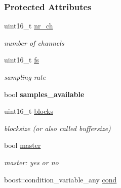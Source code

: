 \subsubsection*{Protected Attributes}
\begin{DoxyCompactItemize}
\item 
\hypertarget{class_h_w_thread_a316d76b7b23a93f25832b7a575cfb8db}{
uint16\_\-t \hyperlink{class_h_w_thread_a316d76b7b23a93f25832b7a575cfb8db}{nr\_\-ch}}
\label{class_h_w_thread_a316d76b7b23a93f25832b7a575cfb8db}

\begin{DoxyCompactList}\small\item\em number of channels \item\end{DoxyCompactList}\item 
\hypertarget{class_h_w_thread_aed1be0f720f7939e6a0ce1b40a2d15dc}{
uint16\_\-t \hyperlink{class_h_w_thread_aed1be0f720f7939e6a0ce1b40a2d15dc}{fs}}
\label{class_h_w_thread_aed1be0f720f7939e6a0ce1b40a2d15dc}

\begin{DoxyCompactList}\small\item\em sampling rate \item\end{DoxyCompactList}\item 
\hypertarget{class_h_w_thread_ae5a5e40cafce975e55d91f129d8ac4dc}{
bool {\bfseries samples\_\-available}}
\label{class_h_w_thread_ae5a5e40cafce975e55d91f129d8ac4dc}

\item 
\hypertarget{class_h_w_thread_abef19c1294d62c789a37e8f1e1af0c97}{
uint16\_\-t \hyperlink{class_h_w_thread_abef19c1294d62c789a37e8f1e1af0c97}{blocks}}
\label{class_h_w_thread_abef19c1294d62c789a37e8f1e1af0c97}

\begin{DoxyCompactList}\small\item\em blocksize (or also called buffersize) \item\end{DoxyCompactList}\item 
\hypertarget{class_h_w_thread_a7adb2978af51e216016420d5e8629647}{
bool \hyperlink{class_h_w_thread_a7adb2978af51e216016420d5e8629647}{master}}
\label{class_h_w_thread_a7adb2978af51e216016420d5e8629647}

\begin{DoxyCompactList}\small\item\em master: yes or no \item\end{DoxyCompactList}\item 
\hypertarget{class_h_w_thread_add3904adca1c3689bdb7bbc8e72c3b10}{
boost::condition\_\-variable\_\-any \hyperlink{class_h_w_thread_add3904adca1c3689bdb7bbc8e72c3b10}{cond}}
\label{class_h_w_thread_add3904adca1c3689bdb7bbc8e72c3b10}


\end{DoxyCompactItemize}
